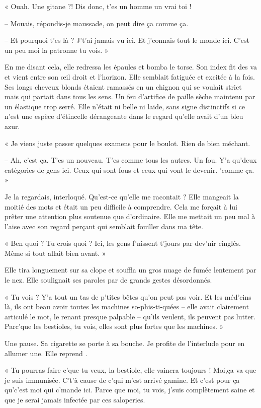 « Ouah. Une gitane ?! Dis donc, t'es un homme un vrai toi !

-- Mouais, répondis-je maussade, on peut dire ça comme ça.

-- Et pourquoi t'es là ? J't'ai jamais vu ici. Et j'connais tout le monde ici. C'est un peu moi la patronne tu vois. »

En me disant cela, elle redressa les épaules et bomba le torse. Son index fit des va et vient entre son œil droit et 
l'horizon. Elle semblait fatiguée et excitée à la fois. Ses longs cheveux blonds étaient ramassés en un chignon qui se 
voulait strict mais qui partait dans tous les sens. Un feu d'artifice de paille sèche maintenu par un élastique trop 
serré. Elle n'était ni belle ni laide, sans signe distinctifs si ce n'est une espèce d'étincelle dérangeante dans le 
regard qu'elle avait d'un bleu azur.

« Je viens juste passer quelques examens pour le boulot. Rien de bien méchant.

-- Ah, c'est ça. T'es un nouveau. T'es comme tous les autres. Un fou. Y'a qu'deux catégories de gens ici. Ceux qui sont 
fous et ceux qui vont le devenir. 'comme ça. »

Je la regardais, interloqué. Qu'est-ce qu'elle me racontait ? Elle mangeait la moitié des mots et était un peu 
difficile à comprendre. Cela me forçait à lui prêter une attention plus soutenue que d'ordinaire. Elle me mettait un 
peu mal à l'aise avec son regard perçant qui semblait fouiller dans ma tête.

« Ben quoi ? Tu crois quoi ? Ici, les gens f'nissent t'jours par dev'nir cinglés. Même si tout allait bien avant. »

Elle tira longuement sur sa clope et souffla un gros nuage de fumée lentement par le nez. Elle soulignait ses paroles 
par de grands gestes désordonnés.

« Tu vois ? Y'a tout un tas de p'tites bêtes qu'on peut pas voir. Et les méd'cins là, ils ont beau avoir toutes les 
machines so-phis-ti-quées -- elle avait clairement articulé le mot, le renant presque palpable -- qu'ils veulent, ils 
peuvent pas lutter. Parc'que les bestioles, tu vois, elles sont plus fortes que les machines. »

Une pause. Sa cigarette se porte à sa bouche. Je profite de l'interlude pour en allumer une. Elle reprend .

« Tu pourras faire c'que tu veux, la bestiole, elle vaincra toujours ! Moi,ça va que je suis immunisée. C't'à cause de 
c'qui m'est arrivé gamine. Et c'est pour ça qu'c'est moi qui c'mande ici. Parce que moi, tu vois, j'suis complètement 
saine et que je serai jamais infectée par ces saloperies.

